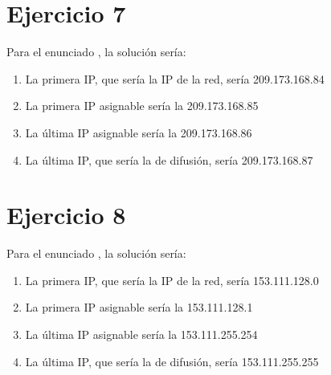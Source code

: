 \documentclass[letterpaper,10pt,spanish]{sphinxmanual}
\begin{document}
\section{Ejercicio 7}
\label{\detokenize{t2_integracion_elementos/ejercicios_subredes_ipv4/rangos_direcciones:id7}}
\sphinxAtStartPar
Para el enunciado , la solución sería:
\begin{enumerate}
%
\item {} 
\sphinxAtStartPar
La primera IP, que sería la IP de la red, sería 209.173.168.84

\item {} 
\sphinxAtStartPar
La primera IP asignable sería la 209.173.168.85

\item {} 
\sphinxAtStartPar
La última IP asignable sería la 209.173.168.86

\item {} 
\sphinxAtStartPar
La última IP, que sería la de difusión, sería 209.173.168.87

\end{enumerate}


\section{Ejercicio 8}
\label{\detokenize{t2_integracion_elementos/ejercicios_subredes_ipv4/rangos_direcciones:id8}}
\sphinxAtStartPar
Para el enunciado , la solución sería:
\begin{enumerate}
%
\item {} 
\sphinxAtStartPar
La primera IP, que sería la IP de la red, sería 153.111.128.0

\item {} 
\sphinxAtStartPar
La primera IP asignable sería la 153.111.128.1

\item {} 
\sphinxAtStartPar
La última IP asignable sería la 153.111.255.254

\item {} 
\sphinxAtStartPar
La última IP, que sería la de difusión, sería 153.111.255.255

\end{enumerate}
\end{document}
